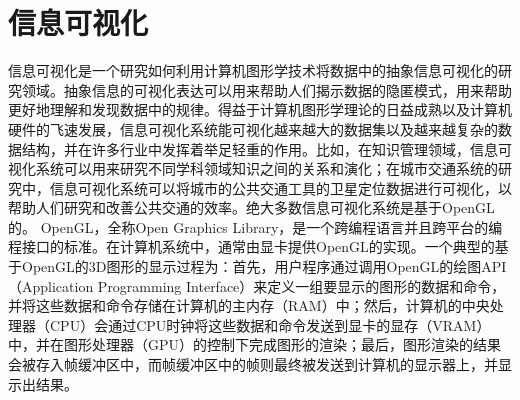 \section{信息可视化}
信息可视化是一个研究如何利用计算机图形学技术将数据中的抽象信息可视化的研究领域。抽象信息的可视化表达可以用来帮助人们揭示数据的隐匿模式，用来帮助更好地理解和发现数据中的规律。得益于计算机图形学理论的日益成熟以及计算机硬件的飞速发展，信息可视化系统能可视化越来越大的数据集以及越来越复杂的数据结构，并在许多行业中发挥着举足轻重的作用。比如，在知识管理领域，信息可视化系统可以用来研究不同学科领域知识之间的关系和演化\cite{ZHHW16}；在城市交通系统的研究中，信息可视化系统可以将城市的公共交通工具的卫星定位数据进行可视化，以帮助人们研究和改善公共交通的效率\cite{FYL15}。绝大多数信息可视化系统是基于\textsf{OpenGL}的。
\textsf{OpenGL}，全称Open Graphics Library，是一个跨编程语言并且跨平台的编程接口的标准。在计算机系统中，通常由显卡提供\textsf{OpenGL}的实现。一个典型的基于\textsf{OpenGL}的3D图形的显示过程为：首先，用户程序通过调用\textsf{OpenGL}的绘图\textsf{API}（Application Programming Interface）来定义一组要显示的图形的数据和命令，并将这些数据和命令存储在计算机的主内存（RAM）中；然后，计算机的中央处理器（CPU）会通过CPU时钟将这些数据和命令发送到显卡的显存（VRAM）中，并在图形处理器（GPU）的控制下完成图形的渲染；最后，图形渲染的结果会被存入帧缓冲区中，而帧缓冲区中的帧则最终被发送到计算机的显示器上，并显示出结果。

